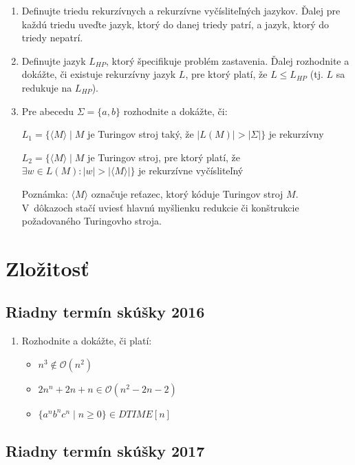 \documentclass[11pt,a4paper]{article}
\begin{document}
		\begin{enumerate}
			\item Definujte triedu rekurzívnych a rekurzívne vyčísliteľných jazykov. Ďalej pre každú triedu uveďte jazyk, ktorý do danej triedy patrí, a jazyk, ktorý do triedy nepatrí.

			\item Definujte jazyk $L_{HP}$, ktorý špecifikuje problém zastavenia. Ďalej rozhodnite a dokážte, či existuje rekurzívny jazyk $L$, pre ktorý platí, že $L \leq L_{HP}$ (tj. $L$ sa redukuje na $L_{HP}$).
	
			\item Pre abecedu $\Sigma = \{a, b\}$ rozhodnite a dokážte, či:
	
			$L_1 = \{\langle M \rangle \mid M$ je Turingov stroj taký, že $\vert L(M) \vert  > \vert \Sigma \vert\}$ je rekurzívny
	
			$L_2 = \{\langle M \rangle \mid M$ je Turingov stroj, pre ktorý platí, že $\exists w \in L(M) : \vert w \vert > \vert \langle M \rangle \vert\}$ je rekurzívne vyčísliteľný
	
			Poznámka: $\langle M \rangle$ označuje reťazec, ktorý kóduje Turingov stroj $M$. V~dôkazoch stačí uviesť hlavnú myšlienku redukcie či konštrukcie požadovaného Turingovho stroja.
		\end{enumerate}	

	\section{Zložitosť}

		\subsection{Riadny termín skúšky 2016}

		\begin{enumerate}
			\item Rozhodnite a dokážte, či platí:
			
			\begin{itemize}
				\item $n^3 \notin \mathcal{O}(n^2)$		
				\item $2n^n + 2n + n \in \mathcal{O}(n^2 - 2n - 2)$	
				\item $\{a^nb^nc^n \mid n \geq 0\} \in DTIME[n]$
			\end{itemize}
		\end{enumerate}	

		\subsection{Riadny termín skúšky 2017}
\end{document}

